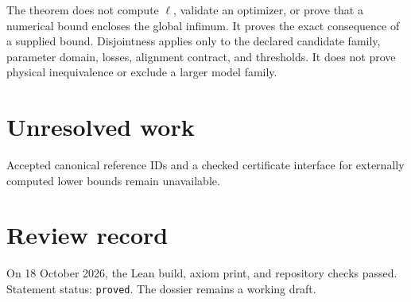\documentclass[11pt]{article}
\begin{document}
The theorem does not compute $\ell$, validate an optimizer, or prove that a numerical
bound encloses the global infimum. It proves the exact consequence of a supplied bound.
Disjointness applies only to the declared candidate family, parameter domain, losses,
alignment contract, and thresholds. It does not prove physical inequivalence or exclude a
larger model family.

\section{Unresolved work}

Accepted canonical reference IDs and a checked certificate interface for externally
computed lower bounds remain unavailable.

\section{Review record}

On 18 October 2026, the Lean build, axiom print, and repository checks passed. Statement
status: \texttt{proved}. The dossier remains a working draft.
\end{document}
